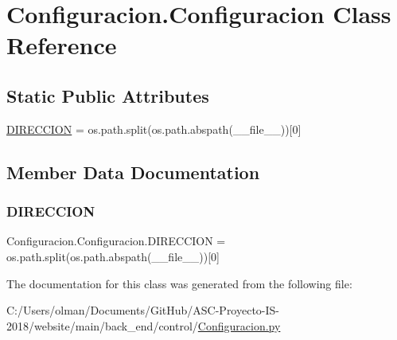 \hypertarget{class_configuracion_1_1_configuracion}{}\section{Configuracion.\+Configuracion Class Reference}
\label{class_configuracion_1_1_configuracion}
\subsection*{Static Public Attributes}
\begin{DoxyCompactItemize}
\item 
\mbox{\hyperlink{class_configuracion_1_1_configuracion_a8aed3273377e5707e9a22f395d5562e9}{D\+I\+R\+E\+C\+C\+I\+ON}} = os.\+path.\+split(os.\+path.\+abspath(\+\_\+\+\_\+file\+\_\+\+\_\+))\mbox{[}0\mbox{]}
\end{DoxyCompactItemize}


\subsection{Member Data Documentation}
\mbox{\label{class_configuracion_1_1_configuracion_a8aed3273377e5707e9a22f395d5562e9}} 
\subsubsection{\texorpdfstring{D\+I\+R\+E\+C\+C\+I\+ON}{DIRECCION}}
{\footnotesize\ttfamily Configuracion.\+Configuracion.\+D\+I\+R\+E\+C\+C\+I\+ON = os.\+path.\+split(os.\+path.\+abspath(\+\_\+\+\_\+file\+\_\+\+\_\+))\mbox{[}0\mbox{]}\hspace{0.3cm}{\ttfamily [static]}}



The documentation for this class was generated from the following file\+:\begin{DoxyCompactItemize}
\item 
C\+:/\+Users/olman/\+Documents/\+Git\+Hub/\+A\+S\+C-\/\+Proyecto-\/\+I\+S-\/2018/website/main/back\+\_\+end/control/\mbox{\hyperlink{_configuracion_8py}{Configuracion.\+py}}\end{DoxyCompactItemize}
